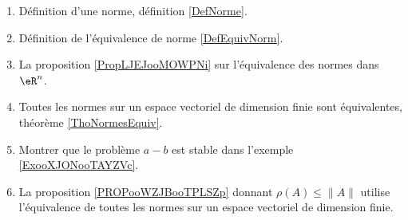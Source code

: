 
    \begin{enumerate}
        \item
            Définition d'une norme, définition \ref{DefNorme}.
        \item
            Définition de l'équivalence de norme \ref{DefEquivNorm}.
\item
    La proposition \ref{PropLJEJooMOWPNi} sur l'équivalence des normes dans \( \eR^n\).
\item
    Toutes les normes sur un espace vectoriel de dimension finie sont équivalentes, théorème \ref{ThoNormesEquiv}.
\item
    Montrer que le problème \( a-b\) est stable dans l'exemple \ref{ExooXJONooTAYZVc}.
\item
    La proposition \ref{PROPooWZJBooTPLSZp} donnant \( \rho(A)\leq \| A \|\) utilise l'équivalence de toutes les normes sur un espace vectoriel de dimension finie.
\end{enumerate}

